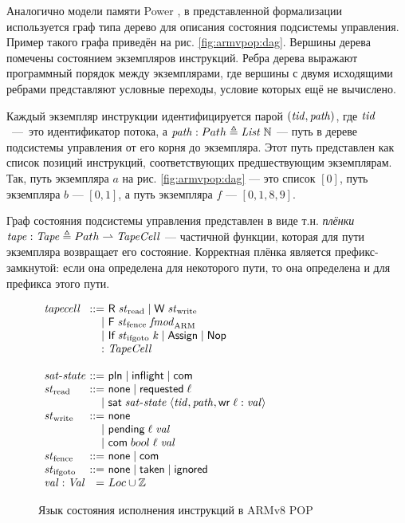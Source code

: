 Аналогично модели памяти Power \cite{Sarkar-al:PLDI11}, в представленной формализации
используется граф типа дерево для описания состояния подсистемы управления.
Пример такого графа приведён на рис. \ref{fig:armvpop:dag}.
Вершины дерева помечены состоянием экземпляров инструкций.
Ребра дерева выражают программный порядок между экземплярами, где
вершины с двумя исходящими ребрами представляют условные переходы, условие
которых ещё не вычислено.

Каждый экземпляр инструкции идентифицируется парой $(\mathit{tid},\mathit{path})$,
где $\mathit{tid}$~---~это идентификатор потока,
а $\mathit{path} : Path \triangleq \mathit{List}\;{\mathbb{N}}$ --- путь в дереве подсистемы управления
от его корня до экземпляра. Этот путь представлен как список позиций инструкций, соответствующих
предшествующим экземплярам. Так, путь экземпляра $a$ на рис. \ref{fig:armvpop:dag} --- это
список $[0]$, путь экземпляра $b$ --- $[0,1]$, а путь экземпляра $f$ --- $[0,1,8,9]$.

Граф состояния подсистемы управления представлен в виде т.н. \emph{плёнки}
$\mathit{tape} : \mathit{Tape} \triangleq Path \rightharpoonup \mathit{TapeCell}$ --- частичной функции, которая для пути экземпляра
возвращает его состояние. Корректная плёнка является префикс-замкнутой: если она определена для
некоторого пути, то она определена и для префикса этого пути.

\begin{figure}
  \begin{center}
$\begin{array}{l @{~} r @{~} l}
\tapeCell & ::= & \tapeRead{\Rstate} \mid \tapeWrite{\Wstate} \\
          & |   & \tapeFence{\Fstate}{\Ftype} \\
          & |   & \tapeIfGoto{\IfState}{\z} \mid \tapeAssign \mid \tapeNop \\
          & :   & \TapeCell \\
\\
\satisfiedState & ::= & \Plain \mid \SatisfiedInFlight \mid \Committed \\
\Rstate & ::= & \None \mid \Issued{\loc} \\
        & |   & \tapeSatisfied{\satisfiedState}{\stRequestWrite{\tId}{\cpath}{\loc}{\stval}} \\
\Wstate   & ::= & \None \\
          & |   & \tapePending{\loc}{\stval} \\
         & |   & \tapeWriteCommitted{bool}{\loc}{\stval}\\
\Fstate  & ::= & \None \mid \Committed\\
\IfState & ::= & \None \mid \Taken \mid \Ignored \; \\
\stval   :  \Stval  &  = & \Loc \cup \mathbb{Z} \\
\end{array}$
  \end{center}
\caption{Язык состояния исполнения инструкций в ARMv8 POP}
\label{fig:tape-arm}
\end{figure}

